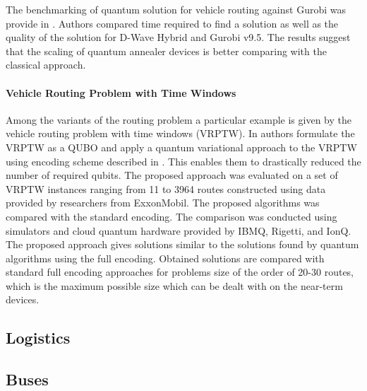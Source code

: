 \documentclass[a4paper,11pt]{article}
\begin{document}
The benchmarking of quantum solution for vehicle routing against Gurobi was provide in \cite{anil2022performance}. Authors compared time required to find a solution as well as the quality of the solution for D-Wave Hybrid and  Gurobi v9.5. The results suggest that the scaling of quantum annealer devices is better comparing with the classical approach.


\paragraph{Vehicle Routing Problem with Time Windows}
Among the variants of the routing problem a particular example is given by the
vehicle routing problem with time windows (VRPTW). In \cite{leonidas2023qubit} authors formulate the VRPTW as a QUBO and apply a quantum variational approach to the VRPTW using encoding scheme described in \cite{vikstaal2020applying}. This enables them to drastically reduced the number of required qubits. The proposed approach was evaluated on a set of VRPTW instances ranging from 11 to 3964 routes constructed using data provided by researchers from ExxonMobil. The proposed algorithms was compared with the standard encoding. The comparison was conducted using simulators and cloud quantum hardware provided by IBMQ, Rigetti, and IonQ. The proposed approach gives solutions similar to the solutions found by quantum algorithms using the full encoding. Obtained solutions are compared with standard full encoding approaches for problems size  of the order of 20-30 routes, which is the maximum possible size which can be dealt with on the near-term devices.

\subsection{Logistics}

\cite{correll2023quantum}


\subsection{Buses}
 \cite{yarkoni2020quantum}

 
\end{document}
